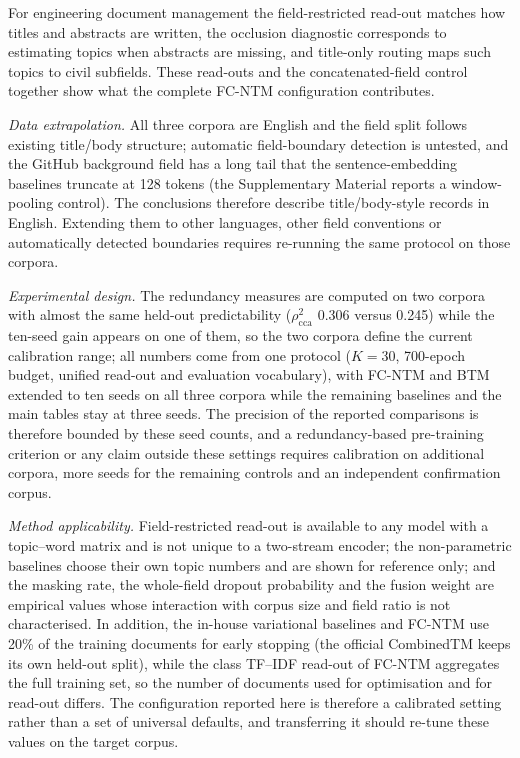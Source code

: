 \documentclass[Journal,letterpaper,NoLists]{ascelike-new}
\newcommand{\fcntm}{FC-NTM}
\begin{document}
For engineering document management the field-restricted read-out matches how titles and
abstracts are written, the occlusion diagnostic corresponds to estimating topics when abstracts are
missing, and title-only routing maps such topics to civil subfields. These read-outs and the
concatenated-field control together show what the complete \fcntm{} configuration contributes.

\emph{Data extrapolation.} All three corpora are English and the field split follows existing
title/body structure; automatic field-boundary detection is untested, and the GitHub background field
has a long tail that the sentence-embedding baselines truncate at 128 tokens (the Supplementary Material
reports a window-pooling control). The conclusions therefore describe title/body-style records in
English. Extending them to other languages, other field conventions or automatically detected
boundaries requires re-running the same protocol on those corpora.

\emph{Experimental design.} The redundancy measures are computed on two corpora with almost the
same held-out predictability ($\rho^2_{\mathrm{cca}}$ 0.306 versus 0.245) while the ten-seed gain
appears on one of them, so the two corpora define the current calibration range; all numbers come
from one protocol ($K=30$, 700-epoch budget, unified read-out and evaluation vocabulary), with
\fcntm{} and BTM extended to ten seeds on all three corpora while the remaining baselines and the
main tables stay at three seeds. The precision of the reported comparisons is therefore bounded by
these seed counts, and a redundancy-based pre-training criterion or any claim outside these settings
requires calibration on additional corpora, more seeds for the remaining controls and an independent
confirmation corpus.

\emph{Method applicability.} Field-restricted read-out is available to any model with a
topic--word matrix and is not unique to a two-stream encoder; the non-parametric baselines choose
their own topic numbers and are shown for reference only; and the masking rate, the whole-field dropout
probability and the fusion weight are empirical values whose interaction with corpus size and field
ratio is not characterised. In addition, the in-house variational baselines and \fcntm{} use 20\% of the
training documents for early stopping (the official CombinedTM keeps its own held-out split), while
the class TF--IDF read-out of \fcntm{} aggregates the full training set, so the number of documents
used for optimisation and for read-out differs. The configuration reported here is therefore a
calibrated setting rather than a set of universal defaults, and transferring it should re-tune these
values on the target corpus.
\end{document}
